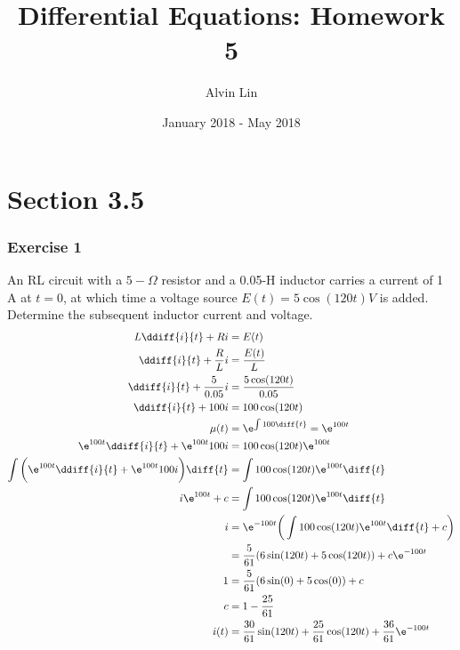 \documentclass{math}
\title{Differential Equations: Homework 5}
\author{Alvin Lin}
\date{January 2018 - May 2018}
\begin{document}
\maketitle
\clearpage

\section*{Section 3.5}

\subsubsection*{Exercise 1}
An RL circuit with a \( 5-\Omega \) resistor and a 0.05-H inductor carries a
current of 1 A at \( t = 0 \), at which time a voltage source
\( E(t) = 5\cos(120t)V \) is added. Determine the subsequent inductor current
and voltage.
\begin{align*}
  L\ddiff{i}{t}+Ri &= E(t) \\
  \ddiff{i}{t}+\frac{R}{L}i &= \frac{E(t)}{L} \\
  \ddiff{i}{t}+\frac{5}{0.05}i &= \frac{5\cos(120t)}{0.05} \\
  \ddiff{i}{t}+100i &= 100\cos(120t) \\
  \mu(t) &= \e^{\int100\diff{t}} = \e^{100t} \\
  \e^{100t}\ddiff{i}{t}+\e^{100t}100i &= 100\cos(120t)\e^{100t} \\
  \int\bigg(\e^{100t}\ddiff{i}{t}+\e^{100t}100i\bigg)\diff{t} &=
    \int100\cos(120t)\e^{100t}\diff{t} \\
  i\e^{100t}+c &= \int100\cos(120t)\e^{100t}\diff{t} \\
  i &= \e^{-100t}\bigg(\int100\cos(120t)\e^{100t}\diff{t}+c\bigg) \\
  &= \frac{5}{61}(6\sin(120t)+5\cos(120t))+c\e^{-100t} \\
  1 &= \frac{5}{61}(6\sin(0)+5\cos(0))+c \\
  c &= 1-\frac{25}{61} \\
  i(t) &= \frac{30}{61}\sin(120t)+\frac{25}{61}\cos(120t)+\frac{36}{61}\e^{-100t} \\
\end{align*}
\end{document}
